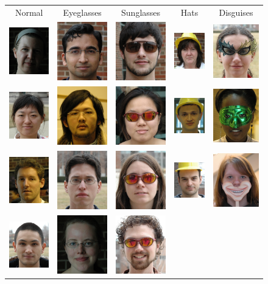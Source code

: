 \begin{figure}
\centering
\newcommand{\imagewidth}{.7in}
\begin{tabular}{ccccc}
Normal & Eyeglasses & Sunglasses & Hats & Disguises \\
\includegraphics[width=\imagewidth]{figures_iccv/real_data_examples/normal_1.jpg} & \includegraphics[width=\imagewidth]{figures_iccv/real_data_examples/glasses_1.jpg} & \includegraphics[width=\imagewidth]{figures_iccv/real_data_examples/sunglasses_1.jpg} & \includegraphics[width=\imagewidth]{figures_iccv/real_data_examples/hats_1.jpg} & \includegraphics[width=\imagewidth]{figures_iccv/real_data_examples/disguise_1.jpg} \\
\includegraphics[width=\imagewidth]{figures_iccv/real_data_examples/normal_2.jpg} & \includegraphics[width=\imagewidth]{figures_iccv/real_data_examples/glasses_2.jpg} & \includegraphics[width=\imagewidth]{figures_iccv/real_data_examples/sunglasses_2.jpg} & \includegraphics[width=\imagewidth]{figures_iccv/real_data_examples/hats_2.jpg} & \includegraphics[width=\imagewidth]{figures_iccv/real_data_examples/disguise_2.jpg} \\
\includegraphics[width=\imagewidth]{figures_iccv/real_data_examples/normal_3.jpg} & \includegraphics[width=\imagewidth]{figures_iccv/real_data_examples/glasses_3.jpg} & \includegraphics[width=\imagewidth]{figures_iccv/real_data_examples/sunglasses_3.jpg} & \includegraphics[width=\imagewidth]{figures_iccv/real_data_examples/hats_3.jpg} & \includegraphics[width=\imagewidth]{figures_iccv/real_data_examples/disguise_3.jpg} \\
\includegraphics[width=\imagewidth]{figures_iccv/real_data_examples/normal_4.jpg} & \includegraphics[width=\imagewidth]{figures_iccv/real_data_examples/glasses_4.jpg} & \includegraphics[width=\imagewidth]{figures_iccv/real_data_examples/sunglasses_4.jpg} & \includegraphics[width=\imagew
\end{tabular}
\end{figure}
